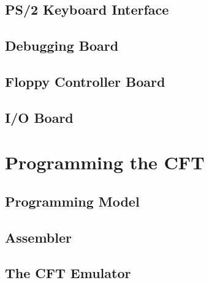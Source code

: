   \ifdefined\renderchapkbd
    \chapter{PS/2 Keyboard Interface}
    \glsresetall
    
  \fi

  \ifdefined\renderchapdeb
    \chapter{Debugging Board}
    \glsresetall
    
  \fi

  \ifdefined\renderchapfdc
    \chapter{Floppy Controller Board}
    \glsresetall
    
  \fi

  \ifdefined\renderchapiob
    \chapter{I/O Board}
    \glsresetall
    
  \fi
\fi


\ifdefined\renderpartprogramming

  \part{Programming the CFT}

  \chapter{Programming Model}
  \glsresetall

  \label{chap:programming-model}
    

  \chapter{Assembler}
  \glsresetall
  
\fi

\ifdefined\renderpartemulator
  \chapter{The CFT Emulator}
  \glsresetall
  \label{chap:emulator}
  
\fi

